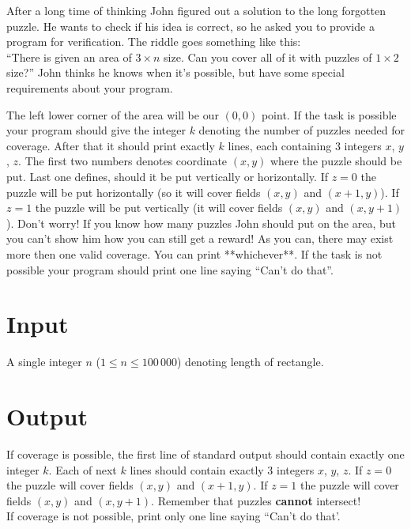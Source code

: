 \documentclass{spiral}
\begin{document}
  \makeheader

  After a long time of thinking John figured out a solution to the long forgotten puzzle.
  He wants to check if his idea is correct, so he asked you to provide a program for verification.
  The riddle goes something like this:\\
  ``There is given an area of $3 \times n$ size. Can you cover all of it with puzzles of $1 \times 2$ size?''
  John thinks he knows when it's possible, but have some special requirements about your program.

  The left lower corner of the area will be our $(0, 0)$ point.
  If the task is possible your program should give the integer $k$
  denoting the number of puzzles needed for coverage.
  After that it should print exactly $k$ lines, each containing 3 integers $x$, $y$, $z$.
  The first two numbers denotes coordinate $(x, y)$ where the puzzle should be put.
  Last one defines, should it be put vertically or horizontally.
  If $z = 0$ the puzzle will be put horizontally (so it will cover fields $(x, y)$ and $(x + 1, y)$).
  If $z = 1$ the puzzle will be put vertically (it will cover fields $(x, y)$ and $(x, y + 1)$).
  Don't worry! If you know how many puzzles John should put on the area, but you can't show him how
  you can still get a reward!
  As you can, there may exist more then one valid coverage. You can print **whichever**.
  If the task is not possible your program should print one line saying ``Can't do that''.


  \section{Input}

    A single integer $n$ ($1 \leq n \leq 100\,000$) denoting length of rectangle.

  \section{Output}

    If coverage is possible, the first line of standard output should contain exactly one integer $k$.
    Each of next $k$ lines should contain exactly 3 integers $x$, $y$, $z$.
    If $z = 0$ the puzzle will cover fields $(x, y)$ and $(x + 1, y)$.
    If $z = 1$ the puzzle will cover fields $(x, y)$ and $(x, y + 1)$.
    Remember that puzzles \textbf{cannot} intersect!\\
    If coverage is not possible, print only one line saying ``Can't do that'.
    

\end{document}
